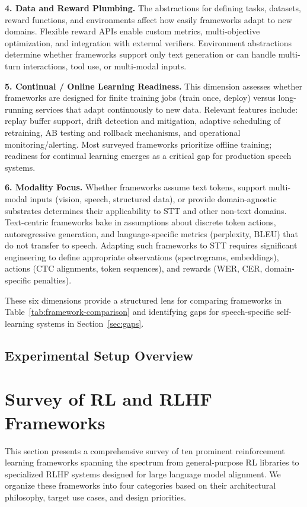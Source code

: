 \documentclass[conference]{IEEEtran}
\begin{document}
\textbf{4. Data and Reward Plumbing.} The abstractions for defining tasks, datasets, reward functions, and environments affect how easily frameworks adapt to new domains. Flexible reward APIs enable custom metrics, multi-objective optimization, and integration with external verifiers. Environment abstractions determine whether frameworks support only text generation or can handle multi-turn interactions, tool use, or multi-modal inputs.

\textbf{5. Continual / Online Learning Readiness.} This dimension assesses whether frameworks are designed for finite training jobs (train once, deploy) versus long-running services that adapt continuously to new data. Relevant features include: replay buffer support, drift detection and mitigation, adaptive scheduling of retraining, AB testing and rollback mechanisms, and operational monitoring/alerting. Most surveyed frameworks prioritize offline training; readiness for continual learning emerges as a critical gap for production speech systems.

\textbf{6. Modality Focus.} Whether frameworks assume text tokens, support multi-modal inputs (vision, speech, structured data), or provide domain-agnostic substrates determines their applicability to STT and other non-text domains. Text-centric frameworks bake in assumptions about discrete token actions, autoregressive generation, and language-specific metrics (perplexity, BLEU) that do not transfer to speech. Adapting such frameworks to STT requires significant engineering to define appropriate observations (spectrograms, embeddings), actions (CTC alignments, token sequences), and rewards (WER, CER, domain-specific penalties).

These six dimensions provide a structured lens for comparing frameworks in Table~\ref{tab:framework-comparison} and identifying gaps for speech-specific self-learning systems in Section~\ref{sec:gaps}.


\subsection{Experimental Setup Overview}

\section{Survey of RL and RLHF Frameworks}

This section presents a comprehensive survey of ten prominent reinforcement learning frameworks spanning the spectrum from general-purpose RL libraries to specialized RLHF systems designed for large language model alignment. We organize these frameworks into four categories based on their architectural philosophy, target use cases, and design priorities.
\end{document}
